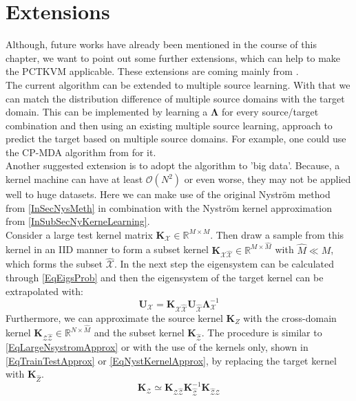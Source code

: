 \section{Extensions}\label{InSubSecFExt}
Although, future works have already been mentioned in the course of this chapter, we want to point out some further extensions, which can help to make the \acs{PCTKVM} applicable.
These extensions are coming mainly from \cite{Long.2015}.\\
The current algorithm can be extended to multiple source learning.
With that we can match the distribution difference of multiple source domains with the target domain.
This can be implemented by learning a $\mathbf{\Lambda}$ for every source/target combination and then using an existing multiple source learning, approach to predict the target based on multiple source domains.
For example, one could use the \ac{CP-MDA} algorithm from \cite{Chattopadhyay.2012} for it.\\
Another suggested extension is to adopt the algorithm to 'big data'.
Because, a kernel machine can have at least $\mathcal{O}(N^2)$ or even worse, they may not be applied well to huge datasets.
Here we can make use of the original Nyström method from \ref{InSecNysMeth} in combination with the Nyström kernel approximation from \ref{InSubSecNyKerneLearning}.\cite{Long.2015}\\
Consider a large test kernel matrix $\mathbf{K}_\mathcal{X} \in \mathbb{R}^{M\times M}$.
Then draw a sample from this kernel in an \acs{IID} manner to form a subset kernel $\mathbf{K}_\mathcal{X\hat{X}} \in \mathbb{R}^{M\times \hat{M}}$ with $\hat{M} \ll M$, which forms the subset $\mathcal{\hat{X}}$.
In the next step the eigensystem can be calculated through \eqref{EqEigsProb} and then the eigensystem of the target kernel can be extrapolated with:\cite{Long.2014}
\begin{equation}\label{EqLargeNsystromApprox}
\mathbf{U}_\mathcal{X}=\mathbf{K}_\mathcal{X\hat{X}}\mathbf{U}_\mathcal{\hat{X}}\mathbf{\Lambda}_\mathcal{X}^{-1}
\end{equation}
Furthermore, we can approximate the source kernel $\mathbf{K}_{Z}$ with the  cross-domain kernel $\mathbf{K}_{\mathcal{Z\hat{Z}}} \in \mathbb{R}^{N\times \hat{M}}$ and the subset kernel $\mathbf{K}_\mathcal{\hat{Z}}$.
The procedure is similar to \eqref{EqLargeNsystromApprox} or with the use of the kernels only, shown in \eqref{EqTrainTestApprox} or \eqref{EqNystKernelApprox}, by replacing the target kernel with $\mathbf{K}_{\hat{Z}}$.
\begin{equation}
\mathbf{K}_\mathcal{Z} \simeq	\mathbf{K}_{\mathcal{Z\hat{Z}}}\mathbf{K}_\mathcal{\hat{Z}}^{-1}\mathbf{K}_{\mathcal{\hat{Z}Z}}
\end{equation}
